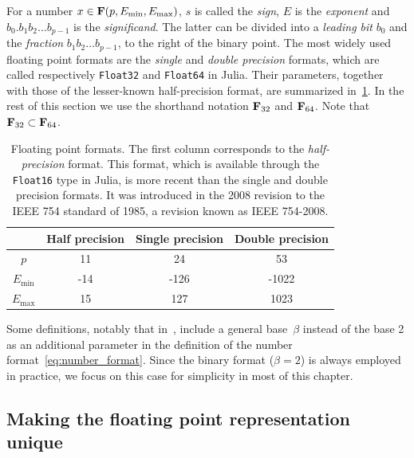 For a number $x \in \mathbf F(p, E_{\min}, E_{\max})$,
$s$ is called the \emph{sign}, $E$ is the \emph{exponent} and
$b_0. b_1 b_2 \dots b_{p-1}$ is the \emph{significand}.
The latter can be divided into a \emph{leading bit} $b_0$ and the \emph{fraction} $b_1 b_2 \dots b_{p-1}$,
to the right of the binary point.
The most widely used floating point formats are the \emph{single} and \emph{double precision} formats,
which are called respectively \texttt{Float32} and \texttt{Float64} in Julia.
Their parameters,
together with those of the lesser-known half-precision format,
are summarized in~\cref{table:floating_point_formats}.
In the rest of this section we use the shorthand notation $\mathbf F_{32}$ and $\mathbf F_{64}$.
Note that $\mathbf F_{32} \subset \mathbf F_{64}$.
\begin{table}[ht]
    \centering
    \begin{tabular}{|c|c|c|c|}
        \hline
        & Half precision & Single precision & Double precision
        \\ \hline
        $p$ & 11 & 24 & 53
        \\ \hline
        $E_{\min}$ & -14 & -126 & -1022
        \\ \hline
        $E_{\max}$ & 15 & 127 & 1023
        \\ \hline
    \end{tabular}
    \caption{%
        Floating point formats.
        The first column corresponds to the \emph{half-precision} format.
        This format,
        which is available through the \texttt{Float16} type in Julia,
        is more recent than the single and double precision formats.
        It was introduced in the 2008 revision to the IEEE 754 standard of 1985,
        a revision known as IEEE 754-2008.
    }%
    \label{table:floating_point_formats}
\end{table}

\begin{remark}
    Some definitions,
    notably that in~\cite[Section 2.5.2]{MR2265914},
    include a general base~$\beta$ instead of the base 2
    as an additional parameter in the definition of the number format~\eqref{eq:number_format}.
    Since the binary format ($\beta = 2$) is always employed in practice,
    we focus on this case for simplicity in most of this chapter.
\end{remark}

\subsection{Making the floating point representation unique}%
\label{sub:defining_a_unique_representation}

